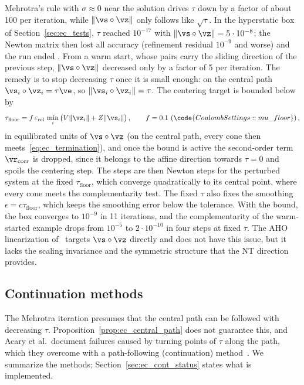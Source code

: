 %
Mehrotra's rule with $\sigma \approx 0$ near the solution drives $\tau$ down by a factor of about 100 per iteration, while $\|\vs\circ\vz\|$ only follows like $\sqrt{\tau}$. In the hyperstatic box of Section~\ref{sec:ec_tests}, $\tau$ reached $10^{-17}$ with $\|\vs\circ\vz\| = 5 \cdot 10^{-8}$; the Newton matrix then lost all accuracy (refinement residual $10^{-9}$ and worse) and the run ended . From a warm start, whose pairs carry the sliding direction of the previous step, $\|\vs\circ\vz\|$ decreased only by a factor of 5 per iteration. The remedy is to stop decreasing $\tau$ once it is small enough: on the central path $\vs_i\circ\vz_i = \tau\ve$, so $\|\vs_i\circ\vz_i\| = \tau$. The centering target is bounded below by
%
\begin{equation}\label{eq:ec_floor}
	\tau_{\mathrm{floor}} = f\,\varepsilon_{\mathrm{rel}}\,\min_i\big(V\|\vz_i\| + Z\|\vs_i\|\big) \, , \qquad f = 0.1 \ (\code{CoulombSettings::mu\_floor}) \, ,
\end{equation}
%
in equilibrated units of $\vs\circ\vz$ (on the central path, every cone then meets~\eqref{eq:ec_termination}), and once the bound is active the second-order term $\vr_{\mathrm{corr}}$ is dropped, since it belongs to the affine direction towards $\tau = 0$ and spoils the centering step. The steps are then Newton steps for the perturbed system at the fixed $\tau_{\mathrm{floor}}$, which converge quadratically to its central point, where every cone meets the complementarity test. The fixed $\tau$ also fixes the smoothing $\epsilon = c\tau_{\mathrm{floor}}$, which keeps the smoothing error below the tolerance. With the bound, the box converges to $10^{-9}$ in 11 iterations, and the complementarity of the warm-started example drops from $10^{-5}$ to $2 \cdot 10^{-10}$ in four steps at fixed $\tau$. The AHO linearization of~\cite{Acary2026} targets $\vs\circ\vz$ directly and does not have this issue, but it lacks the scaling invariance and the symmetric structure that the NT direction provides.
%
\subsection{Continuation methods}\label{sec:ec_continuation}
%
The Mehrotra iteration presumes that the central path can be followed with decreasing $\tau$. Proposition~\ref{prop:ec_central_path} does not guarantee this, and Acary et al.\ document failures caused by turning points of $\tau$ along the path, which they overcome with a path-following (continuation) method~\cite{Acary2026}. We summarize the methods; Section~\ref{sec:ec_cont_status} states what is implemented.
%
